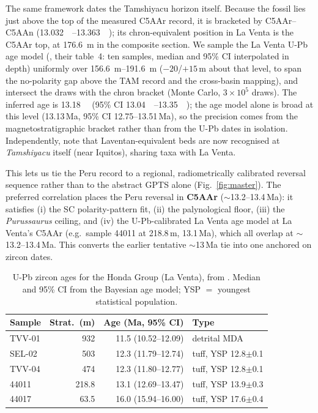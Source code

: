 \documentclass[11pt]{article}
\begin{document}
The same framework dates the Tamshiyacu horizon itself. Because the fossil lies just above
the top of the measured C5AAr record, it is bracketed by C5AAr--C5AAn
(\SIrange{13.032}{13.363}{\mega\annum}); its chron-equivalent position in La Venta is the
C5AAr top, at \SI{176.6}{\meter} in the composite section. We sample the La Venta U-Pb age
model (\citealp{MoraRojas2023}, their table~4: ten samples, median and 95\% CI interpolated in depth) uniformly over
\SIrange{156.6}{191.6}{\meter} ($-20$/$+15$\,m about that level, to span the no-polarity gap
above the TAM record and the cross-basin mapping), and intersect the draws with the chron
bracket (Monte Carlo, $3\times10^5$ draws). The inferred age is \SI{13.18}{\mega\annum}
(95\% CI \SIrange{13.04}{13.35}{\mega\annum}); the age model alone is broad at this level
(13.13\,Ma, 95\% CI 12.75--13.51\,Ma), so the precision comes from the magnetostratigraphic
bracket rather than from the U-Pb dates in isolation. Independently,
\citet{Carrillo2023} note that Laventan-equivalent beds are now recognised at
\emph{Tamshiyacu} itself (near Iquitos), sharing taxa with La Venta.

This lets us tie the Peru record to a regional, radiometrically calibrated
reversal sequence rather than to the abstract GPTS alone (Fig.~\ref{fig:master}).
The preferred correlation places the Peru reversal in \textbf{C5AAr}
($\sim$13.2--13.4\,Ma): it satisfies (i) the SC polarity-pattern fit, (ii) the
palynological floor, (iii) the \textit{Purussaurus} ceiling, and (iv) the
U-Pb-calibrated La Venta age model at La Venta's C5AAr (e.g.\ sample 44011 at
218.8\,m, 13.1\,Ma), which all overlap at $\sim$13.2--13.4\,Ma. This converts the earlier tentative $\sim$13\,Ma tie into
one anchored on zircon dates.

\begin{table}[htbp]\centering
\caption{U-Pb zircon ages for the Honda Group (La Venta), from
\citet{MoraRojas2023}. Median and 95\% CI from the Bayesian age model; YSP $=$
youngest statistical population.}
\label{tab:upb}
\begin{tabular}{@{}lrrl@{}}
\toprule
Sample & Strat.\ (m) & Age (Ma, 95\% CI) & Type \\ \midrule
TVV-01 & 932   & 11.5 (10.52--12.09) & detrital MDA \\
SEL-02 & 503   & 12.3 (11.79--12.74) & tuff, YSP 12.8$\pm$0.1 \\
TVV-04 & 474   & 12.3 (11.80--12.77) & tuff, YSP 12.8$\pm$0.1 \\
44011  & 218.8 & 13.1 (12.69--13.47) & tuff, YSP 13.9$\pm$0.3 \\
44017  & 63.5  & 16.0 (15.94--16.00) & tuff, YSP 17.6$\pm$0.4 \\ \bottomrule
\end{tabular}
\end{table}
\end{document}
